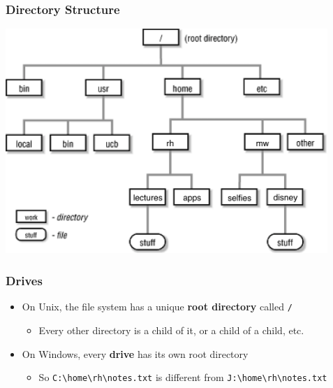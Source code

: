 \documentclass{beamer}
\begin{document}
\begin{frame}\frametitle{Directory Structure}
\includegraphics[height=8.5cm,keepaspectratio]{FS}
\end{frame}


\begin{frame}[fragile]\frametitle{Drives}
\begin{itemize}
\item On Unix, the file system has a unique \textbf{root directory} called \lstinline!/!
\begin{itemize}
    \item Every other directory is a child of it, or a child of a child, etc.
\end{itemize}
\bigskip
\item On Windows, every \textbf{drive} has its own root directory
\begin{itemize}
    \item So \lstinline!C:\home\rh\notes.txt! is different from \lstinline!J:\home\rh\notes.txt!
\end{itemize}
\end{itemize}
\end{frame}
\end{document}
